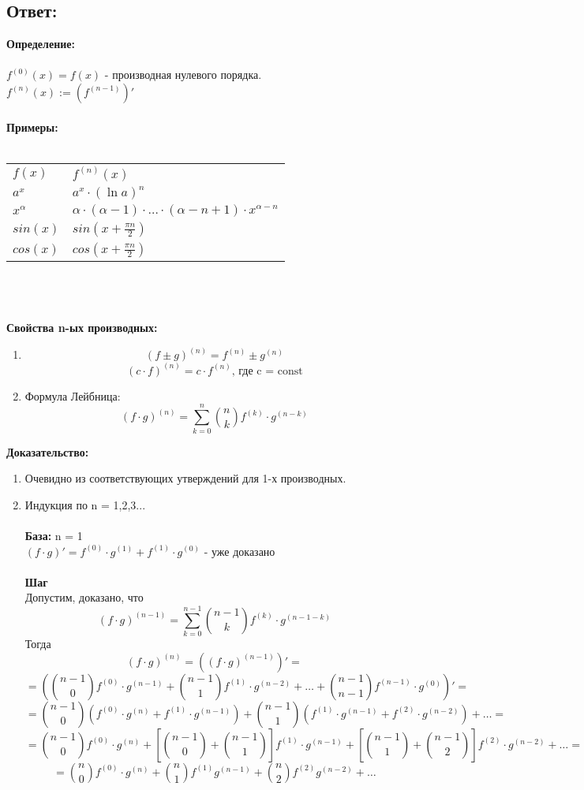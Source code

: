\documentclass{article}
\begin{document}
\subsection*{Ответ:}
\textbf{Определение:}\\\\
$f^{(0)}(x) = f(x)$ - производная нулевого порядка.\\
$f^{(n)}(x) := (f^{(n-1)})'$\\\\
\textbf{Примеры:}\\\\
\begin{tabular}{ l l }
$f(x)$     & $f^{(n)}(x)$\\
$a^x$      & $a^x\cdot(\ln a)^n$\\
$x^\alpha$ & $\alpha\cdot(\alpha-1)\cdot\ldots\cdot(\alpha-n+1)\cdot x^{\alpha-n}$\\
$sin(x)$   & $sin(x+\frac{\pi n}{2})$\\
$cos(x)$   & $cos(x+\frac{\pi n}{2})$\\
\end{tabular}\\\\\\
\textbf{Свойства n-ых производных:}\\
\begin{enumerate}
   \item $$(f\pm g)^{(n)}=f^{(n)}\pm g^{(n)}$$
   $$(c\cdot f)^{(n)} = c\cdot f^{(n)}\text{, где c = const}$$
   \item Формула Лейбница:\\
   $$(f\cdot g)^{(n)}= \sum_{k=0}^{n} \binom{n}{k} f^{(k)}\cdot g^{(n-k)}$$
\end{enumerate}
\textbf{Доказательство:}\\
\begin{enumerate}
   \item Очевидно из соответствующих утверждений для 1-х производных.
   \item Индукция по n = 1,2,3...\\\\
   \textbf{База:} n = 1 \\ $(f\cdot g)' = f^{(0)}\cdot g^{(1)} + f^{(1)}\cdot g^{(0)}$ - уже доказано\\\\
   \textbf{Шаг}\\
   Допустим, доказано, что $$(f\cdot g)^{(n-1)} = \sum_{k=0}^{n-1} \binom{n-1}{k} f^{(k)}\cdot g^{(n-1-k)}$$
   Тогда
   $$(f\cdot g)^{(n)}=((f\cdot g)^{(n-1)})'=$$ $$=(\binom{n-1}{0}f^{(0)}\cdot g^{(n-1)}+\binom{n-1}{1}f^{(1)}\cdot g^{(n-2)}+\ldots+\binom{n-1}{n-1}f^{(n-1)}\cdot g^{(0)})'=$$
   $$=\binom{n-1}{0}(f^{(0)}\cdot g^{(n)}+f^{(1)}\cdot g^{(n-1)})+ \binom{n-1}{1}(f^{(1)}\cdot g^{(n-1)}+f^{(2)}\cdot g^{(n-2)})+\ldots=$$
   $$=\binom{n-1}{0}f^{(0)}\cdot g^{(n)}+[\binom{n-1}{0}+\binom{n-1}{1}]f^{(1)}\cdot g^{(n-1)}+[\binom{n-1}{1}+\binom{n-1}{2}]f^{(2)}\cdot g^{(n-2)}+\ldots=$$
   $$=\binom{n}{0}f^{(0)}\cdot g^{(n)}+\binom{n}{1}f^{(1)}g^{(n-1)}+\binom{n}{2}f^{(2)}g^{(n-2)}+\ldots$$
\end{enumerate}
 
\end{document}

